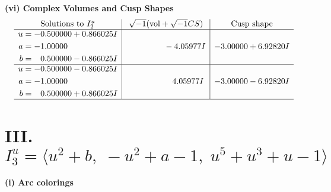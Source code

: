 \documentclass[1p]{elsarticle_modified}
\theoremstyle{definition}
\newcommand{\I}{\sqrt{-1}}
\begin{document}
\newpage\flushleft \textbf{(vi) Complex Volumes and Cusp Shapes}
$$\begin{array}{c|c|c}  
\text{Solutions to }I^u_{2}& \I (\text{vol} + \sqrt{-1}CS) & \text{Cusp shape}\\
 \hline 
\begin{aligned}
u &= -0.500000 + 0.866025 I \\
a &= -1.00000\phantom{ +0.000000I} \\
b &= \phantom{-}0.500000 - 0.866025 I\end{aligned}
 & \phantom{-0.000000 } -4.05977 I & -3.00000 + 6.92820 I \\ \hline\begin{aligned}
u &= -0.500000 - 0.866025 I \\
a &= -1.00000\phantom{ +0.000000I} \\
b &= \phantom{-}0.500000 + 0.866025 I\end{aligned}
 & \phantom{-0.000000 -}4.05977 I & -3.00000 - 6.92820 I\\
 \hline 
 \end{array}$$\newpage\newpage\renewcommand{\arraystretch}{1}
\centering \section*{III. $I^u_{3}= \langle u^2+b,\;- u^2+a-1,\;u^5+u^3+u-1 \rangle$}
\flushleft \textbf{(i) Arc colorings}\\
\end{document}
